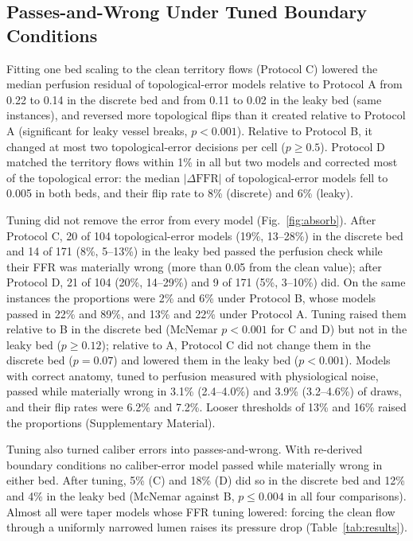 \documentclass[journal]{IEEEtran}
\begin{document}
\subsection{Passes-and-Wrong Under Tuned Boundary Conditions}
Fitting one bed scaling to the clean territory flows (Protocol C) lowered the median perfusion residual of
topological-error models relative to Protocol A from 0.22 to 0.14 in the discrete bed and from 0.11 to 0.02 in the
leaky bed (same instances), and reversed
more topological flips than it created relative to Protocol A (significant for leaky vessel breaks, $p < 0.001$).
Relative to Protocol B, it changed at most two topological-error decisions per cell ($p \geq 0.5$).
Protocol D matched the territory flows within 1\% in all but two models and corrected most of the topological error:
the median $|\Delta\mathrm{FFR}|$ of topological-error models fell to 0.005 in both beds, and their flip rate to 8\%
(discrete) and 6\% (leaky).

Tuning did not remove the error from every model (Fig.~\ref{fig:absorb}). After Protocol C, 20 of 104 topological-error
models (19\%, 13--28\%) in the discrete bed and 14 of 171 (8\%, 5--13\%) in the leaky bed passed the perfusion check
while their FFR was materially wrong (more than 0.05 from the clean value); after Protocol D, 21 of 104 (20\%,
14--29\%) and 9 of 171 (5\%, 3--10\%) did. On the same instances the proportions were 2\% and 6\% under Protocol B, whose models passed in 22\% and 89\%, and
13\% and 22\% under Protocol A. Tuning raised them relative to B in the discrete bed (McNemar $p < 0.001$ for C and D)
but not in the leaky bed ($p \geq 0.12$); relative to A, Protocol C did not change them in the discrete bed
($p = 0.07$) and lowered them in the leaky bed ($p < 0.001$). Models with
correct anatomy, tuned to perfusion measured with physiological noise, passed while materially wrong in 3.1\% (2.4--4.0\%) and 3.9\% (3.2--4.6\%) of draws, and their flip rates were 6.2\% and 7.2\%.
Looser thresholds of 13\% and 16\% raised the proportions (Supplementary Material).

Tuning also turned caliber errors into passes-and-wrong. With re-derived boundary conditions no caliber-error model
passed while materially wrong in either bed. After tuning, 5\% (C) and 18\% (D) did so in the discrete bed and 12\%
and 4\% in the leaky bed (McNemar against B, $p \leq 0.004$ in all four comparisons). Almost all were taper models
whose FFR tuning lowered: forcing the clean flow through a uniformly narrowed lumen raises its pressure drop
(Table~\ref{tab:results}).
\end{document}
